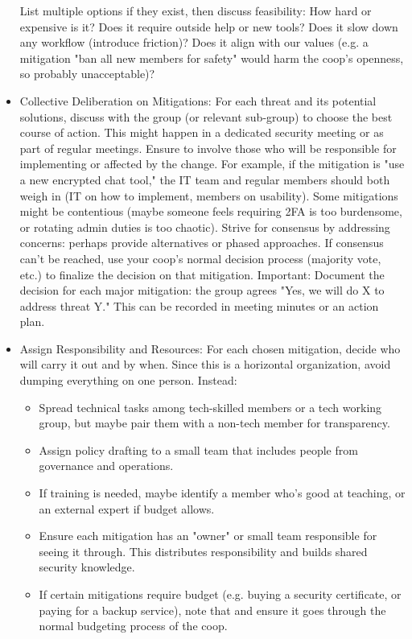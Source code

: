 \begin{itemize}
    List multiple options if they exist, then discuss feasibility: How hard or expensive is it? Does it require
    outside help or new tools? Does it slow down any workflow (introduce friction)? Does it align with our values
    (e.g. a mitigation "ban all new members for safety" would harm the coop's openness, so probably unacceptable)?
    
    \item Collective Deliberation on Mitigations: For each threat and its potential solutions, discuss with the
    group (or relevant sub-group) to choose the best course of action. This might happen in a dedicated security
    meeting or as part of regular meetings. Ensure to involve those who will be responsible for implementing or
    affected by the change. For example, if the mitigation is "use a new encrypted chat tool," the IT team and
    regular members should both weigh in (IT on how to implement, members on usability).
    Some mitigations might be contentious (maybe someone feels requiring 2FA is too burdensome, or rotating admin
    duties is too chaotic). Strive for consensus by addressing concerns: perhaps provide alternatives or phased
    approaches. If consensus can't be reached, use your coop's normal decision process (majority vote, etc.) to
    finalize the decision on that mitigation.
    Important: Document the decision for each major mitigation: the group agrees "Yes, we will do X to address
    threat Y." This can be recorded in meeting minutes or an action plan.
    
    \item Assign Responsibility and Resources: For each chosen mitigation, decide who will carry it out and by
    when. Since this is a horizontal organization, avoid dumping everything on one person. Instead:
        \begin{itemize}   
            \item Spread technical tasks among tech-skilled members or a tech working group, but maybe pair them
    with a non-tech member for transparency.
            \item Assign policy drafting to a small team that includes people from governance and operations.
            \item If training is needed, maybe identify a member who's good at teaching, or an external expert if
    budget allows.
            \item Ensure each mitigation has an "owner" or small team responsible for seeing it through. This
    distributes responsibility and builds shared security knowledge.
            \item If certain mitigations require budget (e.g. buying a security certificate, or paying for a backup
    service), note that and ensure it goes through the normal budgeting process of the coop.
        \end{itemize}
    

\end{itemize}
